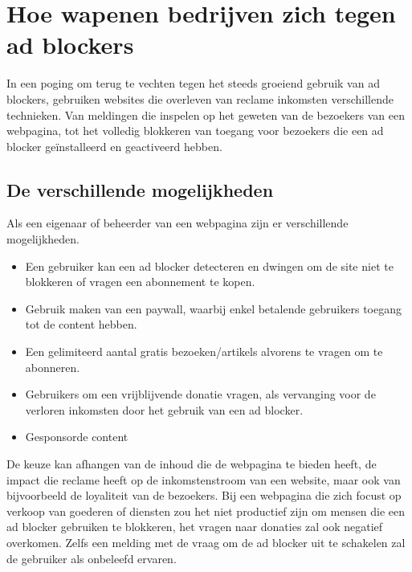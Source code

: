 \documentclass[pdftex,a4paper,12pt,twoside]{report}
\begin{document}
\chapter{Hoe wapenen bedrijven zich tegen ad blockers}
\label{ch:Hoe wapenen bedrijven zich tegen ad blockers}
In een poging om terug te vechten tegen het steeds groeiend gebruik van ad blockers, gebruiken websites die overleven van reclame inkomsten verschillende technieken. Van meldingen die inspelen op het geweten van de bezoekers van een webpagina, tot het volledig blokkeren van toegang voor bezoekers die een ad blocker geïnstalleerd en geactiveerd hebben.

\section{De verschillende mogelijkheden}
\label{sec:De Verschillende mogelijkheden}
Als een eigenaar of beheerder van een webpagina zijn er verschillende mogelijkheden. 

\begin{itemize}
	\item Een gebruiker kan een ad blocker detecteren en dwingen om de site niet te blokkeren of vragen een abonnement te kopen.
	\item Gebruik maken van een paywall, waarbij enkel betalende gebruikers toegang tot de content hebben.
	\item Een gelimiteerd aantal gratis bezoeken/artikels alvorens te vragen om te abonneren.
	\item Gebruikers om een vrijblijvende donatie vragen, als vervanging voor de verloren inkomsten door het gebruik van een ad blocker.
	\item Gesponsorde content
	
\end{itemize}

De keuze kan afhangen van de inhoud die de webpagina te bieden heeft, de impact die reclame heeft op de inkomstenstroom van een website, maar ook van bijvoorbeeld de loyaliteit van de bezoekers. Bij een webpagina die zich focust op verkoop van goederen of diensten zou het niet productief zijn om mensen die een ad blocker gebruiken te blokkeren, het vragen naar donaties zal ook negatief overkomen. Zelfs een melding met de vraag om de ad blocker uit te schakelen zal de gebruiker als onbeleefd ervaren.
\end{document}
